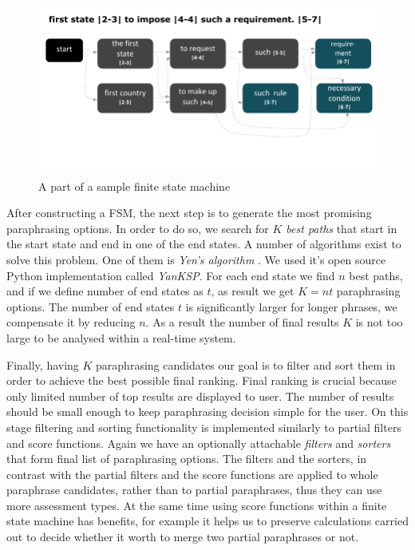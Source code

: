\begin{figure}
 \centering 
 \includegraphics{g/fsm.pdf}
 \caption{A part of a sample finite state machine}
\end{figure}

After constructing a FSM, the next step is to generate the most promising paraphrasing options. In order to do so, we search for \emph{$K$ best paths} that start in the start state and end in one of the end states. A number of algorithms exist to solve this problem. One of them is \emph{Yen's algorithm} \citep{yen1971finding}. We used it's open source Python implementation called \emph{YanKSP}. For each end state we find $n$ best paths, and if we define number of end states as $t$, as result we get $K = nt$ paraphrasing options. The number of end states $t$ is significantly larger for longer phrases, we compensate it by reducing $n$. As a result the number of final results $K$ is not too large to be analysed within a real-time system.

Finally, having $K$ paraphrasing candidates our goal is to filter and sort them in order to achieve the best possible final ranking. Final ranking is crucial because only limited number of top results are displayed to user. The number of results should be small enough to keep paraphrasing decision simple for the user. On this stage filtering and sorting functionality is implemented similarly to partial filters and score functions. Again we have an optionally attachable \emph{filters} and \emph{sorters} that form final list of paraphrasing options. The filters and the sorters, in contrast with the partial filters and the score functions are applied to whole paraphrase candidates, rather than to partial paraphrases, thus they can use more assessment types. At the same time using score functions within a finite state machine has benefits, for example it helps us to preserve calculations carried out to decide whether it worth to merge two partial paraphrases or not. 

